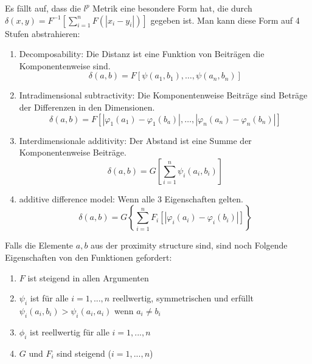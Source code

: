 \begin{rem}\label{add-diff-model}
  Es fällt auf, dass die $l^p$ Metrik eine besondere Form hat, die durch $\delta(x,y) = F^{-1} \left[ \sum_{i=1}^{n} F(|x_i - y_i|) \right]$ gegeben ist. Man kann diese Form auf 4 Stufen abstrahieren:
  \begin{enumerate}
  \item Decomposability: Die Distanz ist eine Funktion von Beiträgen die Komponentenweise sind.\\
    \begin{equation}\label{decomp}
    \delta(a,b) = F[\psi(a_1, b_1), \ldots , \psi(a_n, b_n)]
    \end{equation}
  \item Intradimensional subtractivity: Die Komponentenweise Beiträge sind Beträge der Differenzen in den Dimensionen.\\
    \begin{equation}\label{subtr}
    \delta(a,b) = F[ |\varphi_1(a_1) - \varphi_1(b_a)| , \ldots , | \varphi_n(a_n) - \varphi_n(b_n)| ]
  \end{equation}
  \item Interdimensionale additivity: Der Abstand ist eine Summe der Komponentenweise Beiträge.
    \begin{equation}\label{iterdim-add}
    \delta(a,b) = G \left [ \sum_{i=1}^{n} \psi_i(a_i, b_i) \right]
  \end{equation}
  \item additive difference model: Wenn alle 3 Eigenschaften gelten.
    \begin{equation}\label{add-diff-model}
    \delta(a,b) = G \left \{ \sum_{i=1}^{n} F_i[ | \varphi_i(a_i) - \varphi_i(b_i)| ] \right \}
    \end{equation}
  \end{enumerate}

  Falls die Elemente $a, b$ aus der proximity structure sind, sind noch Folgende Eigenschaften von den Funktionen gefordert:
  \begin{enumerate}
    \item $F$  ist steigend in allen Argumenten
    \item $\psi_i$ ist für alle $i = 1, ..., n$ reellwertig, symmetrischen und erfüllt $\psi_i(a_i, b_i) > \psi_i(a_i, a_i)$ wenn $a_i \neq b_i$
    \item $\phi_i$ ist reellwertig für alle $i = 1, ..., n$
    \item $G$ und $F_i$ sind steigend ($i = 1, ..., n$)
  \end{enumerate}

\end{rem}

